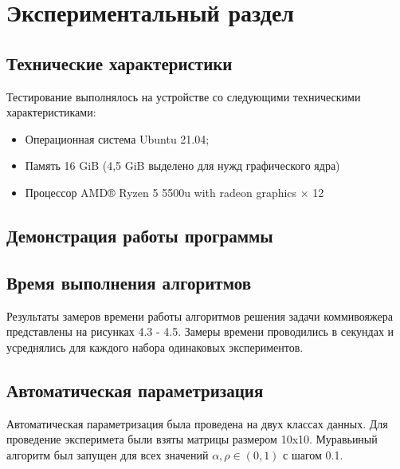 \chapter{Экспериментальный раздел}
\label{cha:research}

\section{Технические характеристики}
Тестирование выполнялось на устройстве со следующими техническими характеристиками:
\begin{itemize}
	\item Операционная система Ubuntu 21.04;
	\item Память 16 GiB (4,5 GiB выделено для нужд графического ядра)
	\item Процессор AMD® Ryzen 5 5500u with radeon graphics × 12 
\end{itemize}

\section{Демонстрация работы программы}


\section{Время выполнения алгоритмов}

Результаты замеров времени работы алгоритмов решения задачи коммивояжера представлены на рисунках 4.3 - 4.5. Замеры времени проводились в секундах и усреднялись для каждого набора одинаковых экспериментов.



\clearpage

\section{Автоматическая параметризация}

Автоматическая параметризация была проведена на двух классах данных. Для проведение эксперимета были взяты матрицы размером 10x10. Муравьиный алгоритм был запущен для всех значений $\alpha, \rho \in (0, 1)$ с шагом 0.1.


